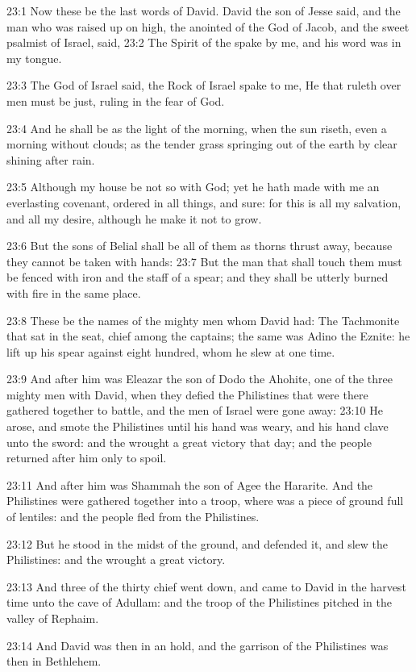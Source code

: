 23:1 Now these be the last words of David. David the son of Jesse said, and the man who was raised up on high, the anointed of the God of Jacob, and the sweet psalmist of Israel, said, 23:2 The Spirit of the \LORD spake by me, and his word was in my tongue.

23:3 The God of Israel said, the Rock of Israel spake to me, He that ruleth over men must be just, ruling in the fear of God.

23:4 And he shall be as the light of the morning, when the sun riseth, even a morning without clouds; as the tender grass springing out of the earth by clear shining after rain.

23:5 Although my house be not so with God; yet he hath made with me an everlasting covenant, ordered in all things, and sure: for this is all my salvation, and all my desire, although he make it not to grow.

23:6 But the sons of Belial shall be all of them as thorns thrust away, because they cannot be taken with hands: 23:7 But the man that shall touch them must be fenced with iron and the staff of a spear; and they shall be utterly burned with fire in the same place.

23:8 These be the names of the mighty men whom David had: The Tachmonite that sat in the seat, chief among the captains; the same was Adino the Eznite: he lift up his spear against eight hundred, whom he slew at one time.

23:9 And after him was Eleazar the son of Dodo the Ahohite, one of the three mighty men with David, when they defied the Philistines that were there gathered together to battle, and the men of Israel were gone away: 23:10 He arose, and smote the Philistines until his hand was weary, and his hand clave unto the sword: and the \LORD wrought a great victory that day; and the people returned after him only to spoil.

23:11 And after him was Shammah the son of Agee the Hararite. And the Philistines were gathered together into a troop, where was a piece of ground full of lentiles: and the people fled from the Philistines.

23:12 But he stood in the midst of the ground, and defended it, and slew the Philistines: and the \LORD wrought a great victory.

23:13 And three of the thirty chief went down, and came to David in the harvest time unto the cave of Adullam: and the troop of the Philistines pitched in the valley of Rephaim.

23:14 And David was then in an hold, and the garrison of the Philistines was then in Bethlehem.

